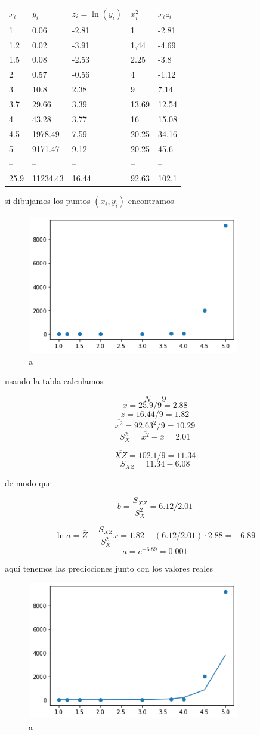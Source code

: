 \documentclass[]{book}
\theoremstyle{plain}
\theoremstyle{definition}
\begin{document}
\begin{longtable}[]{@{}lllll@{}}
\toprule
\(x_i\) & \(y_i\) & \(z_i = \ln(y_i)\) & \(x_i^2\) &
\(x_i z_i\)\tabularnewline
\midrule
\endhead
1 & 0.06 & -2.81 & 1 & -2.81\tabularnewline
1.2 & 0.02 & -3.91 & 1,44 & -4.69\tabularnewline
1.5 & 0.08 & -2.53 & 2.25 & -3.8\tabularnewline
2 & 0.57 & -0.56 & 4 & -1.12\tabularnewline
3 & 10.8 & 2.38 & 9 & 7.14\tabularnewline
3.7 & 29.66 & 3.39 & 13.69 & 12.54\tabularnewline
4 & 43.28 & 3.77 & 16 & 15.08\tabularnewline
4.5 & 1978.49 & 7.59 & 20.25 & 34.16\tabularnewline
5 & 9171.47 & 9.12 & 20.25 & 45.6\tabularnewline
-- & -- & -- & -- & --\tabularnewline
25.9 & 11234.43 & 16.44 & 92.63 & 102.1\tabularnewline
\bottomrule
\end{longtable}

si dibujamos los puntos \((x_i,y_i)\) encontramos

\begin{figure}
\centering
\includegraphics[width=3.64583in,height=\textheight]{img/exponential_regression.png}
\caption{a}
\end{figure}

usando la tabla calculamos

\[N=9\] \[\overline{x} = 25.9/9 = 2.88\]
\[\overline{z} = 16.44/9 = 1.82\] \[\overline{x^2}=92.63^2/9 = 10.29\]
\[S^2_X=\overline{x^2} - \overline{x} = 2.01\]

\[\overline{XZ} = 102.1/9 = 11.34\] \[S_{XZ}=11.34 - 6.08\]

de modo que

\[b = \frac{S_{XZ}}{S^2_X} = 6.12/2.01 \]

\[\ln a = \overline{Z} - \frac{S_{XZ}}{S^2_X} \overline x = 1.82 - (6.12/2.01)\cdot 2.88 = -6.89\]
\[a = e^{ -6.89} = 0.001\]

aquí tenemos las predicciones junto con los valores reales

\begin{figure}
\centering
\includegraphics[width=3.64583in,height=\textheight]{img/exponential_regression3.png}
\caption{a}
\end{figure}
\end{document}
